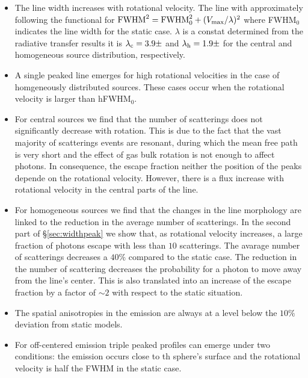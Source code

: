 \documentclass{emulateapj}
\newcommand{\ly}{{\ifmmode{{\rm Ly}\alpha~}\else{Ly$\alpha$~}\fi}}
\begin{document}
\begin{itemize}

\item The line width increases with rotational velocity. The line with
  approximately following the functional for  ${\rm FWHM}^2 = {\rm FWHM}_{
    0}^2 + (V_{\rm max}/\lambda)^2$ where FWHM$_{0}$ indicates the line
  width for the static case. $\lambda$ is a constat determined from
  the radiative transfer results it is $\lambda_{\rm c}=3.9\pm$ and
  $\lambda_{\rm h}=1.9\pm$ for the central and homogeneous source
  distribution, respectively.


\item A single peaked line emerges for high rotational velocities in
  the case of homgeneously distributed sources. These cases occur when
  the rotational velocity is larger than hFWHM$_0$.  

\item For central sources we find that the number of scatterings
does not significantly decrease with rotation. This is due to the 
fact that the vast majority of scatterings events are resonant, 
during which the mean free path is very short and the effect of gas
bulk rotation is not enough to affect \ly photons. In consequence, 
the escape fraction neither the position of the peaks depende on the
rotational velocity. However, there is a flux increase with rotational
velocity in the central parts of the line.


\item For homogeneous sources we find that the changes in the
line morphology are linked to the reduction in the average number of
scatterings. In the second part of \S \ref{sec:widthpeak} we show
that, as rotational velocity increases, a large fraction of photons
escape with less than $10$ scatterings. The avarage number of
scatterings decreases a $40\%$ compared to the static case. 
The reduction in the number of scattering decreases the probability
for a photon to move away from the line's center. This is also
translated into an increase of the escape fraction by a factor of
$\sim 2$ with respect to the static situation.

\item The spatial anisotropies in the emission are always at a level
  below the $10\%$ deviation from static models.

\item For off-centered emission triple peaked profiles can emerge
  under two conditions: the emission occurs close to th sphere's
  surface and the rotational velocity is half the FWHM in the static
  case.   
\end{itemize}
\end{document}
